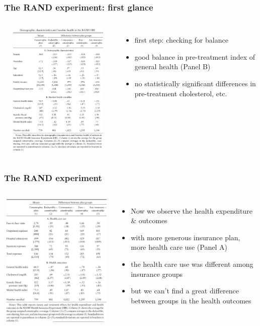 \documentclass{beamer}
\begin{document}
\begin{frame}
\frametitle{The RAND experiment: first glance}
\begin{columns}
\includegraphics[width=10cm,height=6.5cm,keepaspectratio]{RAND Table 2} 

\begin{itemize}
	\item first step: checking for balance
	\item good balance in pre-treatment index of general health (Panel B)
	\item no statistically significant differences in pre-treatment cholesterol, etc. 
\end{itemize}

\end{columns}
\end{frame}
\begin{frame}
\frametitle{The RAND experiment}
\begin{columns}
\includegraphics[width=10cm,height=6.5cm,keepaspectratio]{RAND Table 3} 

\begin{itemize}
	\item Now we observe the health expenditure \& outcomes
	\item with more generous insurance plan, more health care use (Panel A)
	\item the health care use was different among insurance groups
	\item but we can't find a great difference between groups in the health outcomes
\end{itemize}

\end{columns}
\end{frame}
\end{document}
